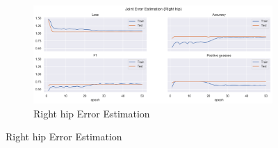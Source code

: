 \begin{figure}[!htbp]
\begin{subfigure}[b]{0.47\linewidth}
        \label{fig:v2_lehi_jt_ee}
    \end{subfigure}
    \hfill
    \begin{subfigure}[b]{0.47\linewidth}
        \centering
        \includegraphics[width=\textwidth]{figures/Results/v2/jt/Right hip_ErrorEstimation.png}
        \caption{Right hip Error Estimation}
        \label{fig:v2_rihi_jt_ee}
    \end{subfigure}
  \end{figure}
  
